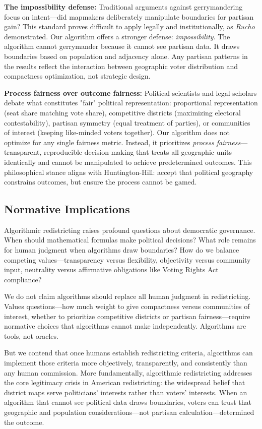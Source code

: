 \textbf{The impossibility defense:} Traditional arguments against gerrymandering focus on intent—did mapmakers deliberately manipulate boundaries for partisan gain? This standard proves difficult to apply legally and institutionally, as \textit{Rucho} demonstrated. Our algorithm offers a stronger defense: \textit{impossibility}. The algorithm cannot gerrymander because it cannot see partisan data. It draws boundaries based on population and adjacency alone. Any partisan patterns in the results reflect the interaction between geographic voter distribution and compactness optimization, not strategic design.

\textbf{Process fairness over outcome fairness:} Political scientists and legal scholars debate what constitutes "fair" political representation: proportional representation (seat share matching vote share), competitive districts (maximizing electoral contestability), partisan symmetry (equal treatment of parties), or communities of interest (keeping like-minded voters together). Our algorithm does not optimize for any single fairness metric. Instead, it prioritizes \textit{process fairness}—transparent, reproducible decision-making that treats all geographic units identically and cannot be manipulated to achieve predetermined outcomes. This philosophical stance aligns with Huntington-Hill: accept that political geography constrains outcomes, but ensure the process cannot be gamed.

\subsection{Normative Implications}

Algorithmic redistricting raises profound questions about democratic governance. When should mathematical formulas make political decisions? What role remains for human judgment when algorithms draw boundaries? How do we balance competing values—transparency versus flexibility, objectivity versus community input, neutrality versus affirmative obligations like Voting Rights Act compliance?

We do not claim algorithms should replace all human judgment in redistricting. Values questions—how much weight to give compactness versus communities of interest, whether to prioritize competitive districts or partisan fairness—require normative choices that algorithms cannot make independently. Algorithms are tools, not oracles.

But we contend that once humans establish redistricting criteria, algorithms can implement those criteria more objectively, transparently, and consistently than any human commission. More fundamentally, algorithmic redistricting addresses the core legitimacy crisis in American redistricting: the widespread belief that district maps serve politicians' interests rather than voters' interests. When an algorithm that cannot see political data draws boundaries, voters can trust that geographic and population considerations—not partisan calculation—determined the outcome.

